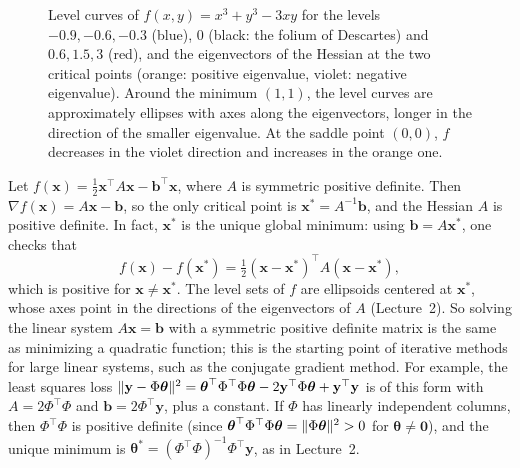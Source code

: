 \begin{figure}[ht]
    \caption{Level curves of $f(x, y) = x^3 + y^3 - 3xy$ for the levels $-0.9, -0.6, -0.3$ (blue), $0$ (black: the folium of Descartes) and $0.6, 1.5, 3$ (red), and the eigenvectors of the Hessian at the two critical points (orange: positive eigenvalue, violet: negative eigenvalue). Around the minimum $(1, 1)$, the level curves are approximately ellipses with axes along the eigenvectors, longer in the direction of the smaller eigenvalue. At the saddle point $(0, 0)$, $f$ decreases in the violet direction and increases in the orange one.}
    \label{L3-fig:critical-points}
\end{figure}

\begin{example}\label{L3-ex:quadratic-min}
    Let $f(\mathbf{x}) = \frac{1}{2}\mathbf{x}^\top A\mathbf{x} - \mathbf{b}^\top\mathbf{x}$, where $A$ is symmetric positive definite. Then $\nabla f(\mathbf{x}) = A\mathbf{x} - \mathbf{b}$, so the only critical point is $\mathbf{x}^* = A^{-1}\mathbf{b}$, and the Hessian $A$ is positive definite. In fact, $\mathbf{x}^*$ is the unique global minimum: using $\mathbf{b} = A\mathbf{x}^*$, one checks that
    \[f(\mathbf{x}) - f(\mathbf{x}^*) = \tfrac{1}{2}(\mathbf{x} - \mathbf{x}^*)^\top A(\mathbf{x} - \mathbf{x}^*),\]
    which is positive for $\mathbf{x} \neq \mathbf{x}^*$. The level sets of $f$ are ellipsoids centered at $\mathbf{x}^*$, whose axes point in the directions of the eigenvectors of $A$ (Lecture~2). So solving the linear system $A\mathbf{x} = \mathbf{b}$ with a symmetric positive definite matrix is the same as minimizing a quadratic function; this is the starting point of iterative methods for large linear systems, such as the conjugate gradient method. For example, the least squares loss $\lVert \mathbf{y} - \Phi\boldsymbol{\theta} \rVert^2 = \boldsymbol{\theta}^\top\Phi^\top\Phi\boldsymbol{\theta} - 2\mathbf{y}^\top\Phi\boldsymbol{\theta} + \mathbf{y}^\top\mathbf{y}$ is of this form with $A = 2\Phi^\top\Phi$ and $\mathbf{b} = 2\Phi^\top\mathbf{y}$, plus a constant. If $\Phi$ has linearly independent columns, then $\Phi^\top\Phi$ is positive definite (since $\boldsymbol{\theta}^\top\Phi^\top\Phi\boldsymbol{\theta} = \lVert \Phi\boldsymbol{\theta} \rVert^2 > 0$ for $\boldsymbol{\theta} \neq \mathbf{0}$), and the unique minimum is $\boldsymbol{\theta}^* = (\Phi^\top\Phi)^{-1}\Phi^\top\mathbf{y}$, as in Lecture~2.
\end{example}

